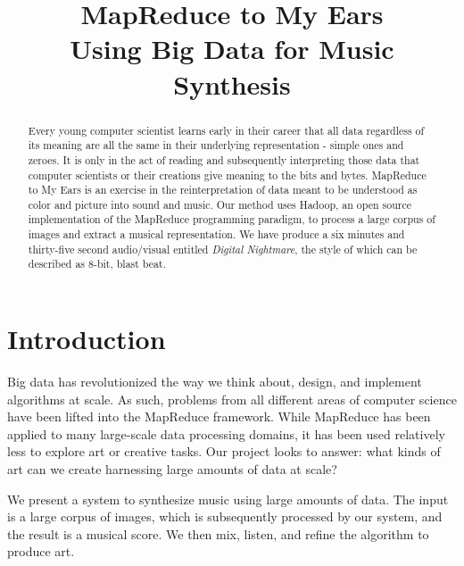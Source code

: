 \documentclass[10pt, conference, compsocconf]{IEEEtran}
\begin{document}
%

\title{MapReduce to My Ears\\
{\Large Using Big Data for Music Synthesis}
}

\author{
}

\maketitle

\begin{abstract}
Every young computer scientist learns early in their career that all
data regardless of its meaning are all the same in their underlying
representation - simple ones and zeroes.
 It is only in the act of
reading and subsequently interpreting those data that computer
scientists or their creations give meaning to the bits and bytes.
MapReduce to My Ears is an exercise in the reinterpretation of data
meant to be understood as color and picture into sound and music.
Our method uses Hadoop, an open source implementation of the MapReduce
programming paradigm, to process a large corpus of images and extract
a musical representation.
 We have produce a six minutes and
thirty-five second audio/visual entitled \emph{Digital Nightmare}, the
style of which can be described as 8-bit, blast beat.
\end{abstract}

\section{Introduction}
\label{sec:introduction}

Big data has revolutionized the way we think about, design, and
implement algorithms at scale.  As such, problems from all different
areas of computer science have been lifted into the MapReduce
framework.  While MapReduce has been applied to many large-scale data
processing domains, it has been used relatively less to explore art or
creative tasks.  Our project looks to answer: what kinds of art can we
create harnessing large amounts of data at scale?

We present a system to synthesize music using large amounts of data.
The input is a large corpus of images, which is subsequently processed
by our system, and the result is a musical score.  We then mix,
listen, and refine the algorithm to produce art.
\end{document}
